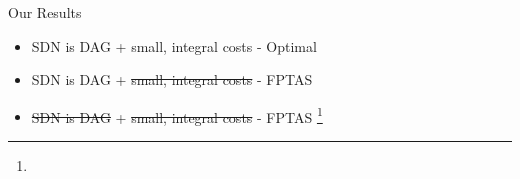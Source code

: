 \begin{frame}{Our Results}
\begin{itemize}[<+>]
  \item SDN is DAG + small, integral costs - Optimal 
  \item SDN is DAG + \st{small, integral costs} - FPTAS
  \item<+-> \st{SDN is DAG} + \st{small, integral costs} - FPTAS
  \footnote{}
\end{itemize}
\end{frame}
